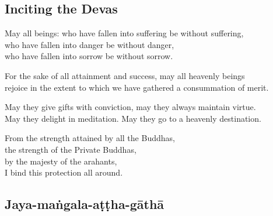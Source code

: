 
\subsection{Inciting the Devas}


May all beings: who have fallen into suffering be without suffering,\\
who have fallen into danger be without danger,\\
who have fallen into sorrow be without sorrow.

For the sake of all attainment and success, may all heavenly beings\\
rejoice in the extent to which we have gathered a consummation of merit.

May they give gifts with conviction, may they always maintain virtue.\\
May they delight in meditation. May they go to a heavenly destination.

From the strength attained by all the Buddhas,\\
the strength of the Private Buddhas,\\
by the majesty of the arahants,\\
I bind this protection all around.

\subsection{Jaya-maṅgala-aṭṭha-gāthā}
\label{bahum}


